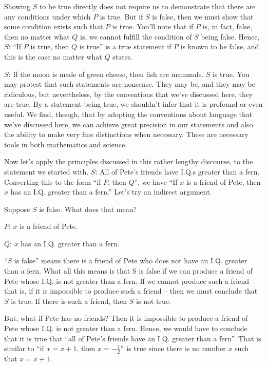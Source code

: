 \documentclass[english]{book}
\begin{document}
Showing $S$ to be true directly does not require us to demonstrate that there are any conditions under which $P$ is true. But if $S$ is false, then we must show that some condition exists such that $P$ is true. You'll note that if $P$ is, in fact, false, then no matter what $Q$ is, we cannot fulfill the condition of $S$ being false. Hence, $S$: ``If $P$ is true, then $Q$ is true'' is a true statement if $P$ is known to be false, and this is the case no matter what $Q$ states.

$S$: If the moon is made of green cheese, then fish are mammals. $S$ is true. You may protest that such statements are nonsense. They may be, and they may be ridiculous, but nevertheless, by the conventions that we've discussed here, they are true. By a statement being true, we shouldn't infer that it is profound or even useful. We find, though, that by adopting the conventions about language that we've discussed here, we can achieve great precision in our statements and also the ability to make very fine distinctions when necessary. These are necessary tools in both mathematics and science.

Now let's apply the principles discussed in this rather lengthy discourse, to the statement we started with. $S$: All of Pete's friends have I.Q.s greater than a fern. Converting this to the form ``if $P$, then $Q$'', we have ``If $x$ is a friend of Pete, then $x$ has an I.Q. greater than a fern.'' Let's try an indirect argument.

Suppose $S$ is false. What does that mean? 

$P$: $x$ is a friend of Pete.

$Q$: $x$ has an I.Q. greater than a fern. 

``$S$ is false'' means there is a friend of Pete who does not have an I.Q. greater than a fern. What all this means is that S is false if we can produce a friend of Pete whose I.Q. is not greater than a fern. If we cannot produce such a friend -- that is, if it is impossible to produce such a friend -- then we must conclude that $S$ is true. If there is such a friend, then $S$ is not true. 

But, what if Pete has no friends? Then it is impossible to produce a friend of Pete whose I.Q. is not greater than a fern. Hence, we would have to conclude that it is true that ``all of Pete's friends have an I.Q. greater than a fern''. That is similar to ``if $x = x+1$, then $x = -\frac{1}{2}''$ is true since there is no number $x$ such that $x = x+1$.
\end{document}
